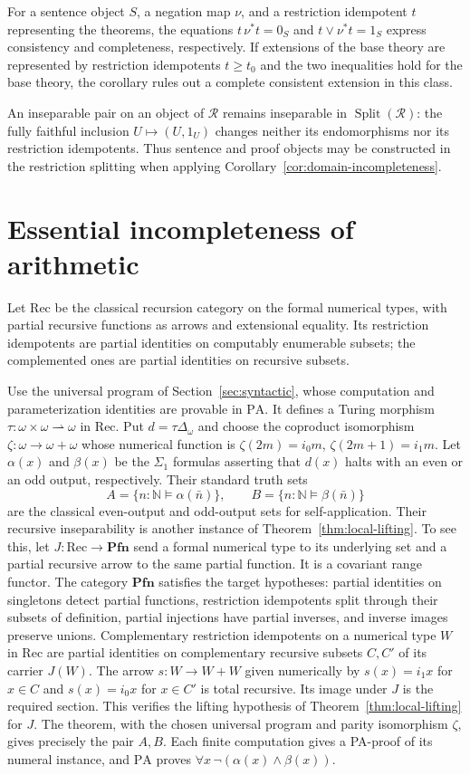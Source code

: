 \documentclass[11pt]{article}
\newcommand{\N}{\mathbb N}
\newcommand{\PA}{\mathrm{PA}}
\newcommand{\Pfn}{\mathbf{Pfn}}
\begin{document}
For a sentence object $S$, a negation map $\nu$, and a restriction
idempotent $t$ representing the theorems, the equations
$t\,\nu^*t=0_S$ and $t\vee\nu^*t=1_S$
express consistency and completeness, respectively.
If extensions of the base theory are represented by restriction
idempotents $t\ge t_0$ and the two inequalities hold for the base
theory, the corollary rules out a complete consistent extension
in this class.

An inseparable pair on an object of $\mathscr R$ remains inseparable
in $\operatorname{Split}(\mathscr R)$: the fully faithful inclusion
$U\mapsto(U,1_U)$ changes neither its endomorphisms nor its restriction idempotents.
Thus sentence and proof objects may be constructed in the restriction
splitting when applying Corollary~\ref{cor:domain-incompleteness}.

\section{Essential incompleteness of arithmetic}\label{sec:arithmetic}

Let $\mathrm{Rec}$ be the classical recursion category on the formal
numerical types, with partial recursive functions as arrows and extensional
equality. Its restriction idempotents are partial identities on
computably enumerable subsets; the complemented ones are partial
identities on recursive subsets.

Use the universal program of Section~\ref{sec:syntactic}, whose
computation and parameterization identities are provable in $\PA$.
It defines a Turing morphism
$\tau:\omega\times\omega\rightharpoonup\omega$ in $\mathrm{Rec}$.
Put $d=\tau\Delta_{\omega}$ and choose the coproduct isomorphism
$\zeta:\omega\to\omega+\omega$ whose numerical function is
$\zeta(2m)=i_0m$, $\zeta(2m+1)=i_1m$.
Let $\alpha(x)$ and $\beta(x)$ be the $\Sigma_1$ formulas asserting
that $d(x)$ halts with an even or an odd output, respectively.
Their standard truth sets
\[
 A=\{n:\N\models\alpha(\bar n)\},\qquad
 B=\{n:\N\models\beta(\bar n)\}
\]
are the classical even-output and odd-output sets for self-application.
Their recursive inseparability is another instance of
Theorem~\ref{thm:local-lifting}. To see this, let
$J:\mathrm{Rec}\to\Pfn$ send a formal numerical type to its underlying
set and a partial recursive arrow to the same partial function.
It is a covariant range functor. The category $\Pfn$ satisfies
the target hypotheses: partial identities on singletons detect partial
functions, restriction idempotents split through their subsets of
definition, partial injections have partial inverses, and inverse images
preserve unions. Complementary restriction idempotents on a numerical type $W$
in $\mathrm{Rec}$ are partial identities on complementary recursive
subsets $C,C'$ of its carrier $J(W)$. The arrow $s:W\to W+W$
given numerically by $s(x)=i_1x$ for $x\in C$ and $s(x)=i_0x$
for $x\in C'$ is total recursive. Its image under $J$ is the
required section. This verifies the lifting hypothesis of
Theorem~\ref{thm:local-lifting} for $J$.
The theorem, with the chosen universal program and parity
isomorphism $\zeta$, gives precisely the pair $A,B$.
Each finite computation gives a PA-proof of its numeral instance, and $\PA$ proves
$\forall x\,\neg(\alpha(x)\land\beta(x))$.
\end{document}

